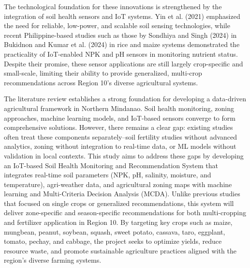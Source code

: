 {The technological foundation for these innovations is strengthened by the integration of soil health sensors and IoT systems. Yin et al. (2021) emphasized the need for reliable, low-power, and scalable soil sensing technologies, while recent Philippine-based studies such as those by Sondhiya and Singh (2024) in Bukidnon and Kumar et al. (2024) in rice and maize systems demonstrated the practicality of IoT-enabled NPK and pH sensors in monitoring nutrient status. Despite their promise, these sensor applications are still largely crop-specific and small-scale, limiting their ability to provide generalized, multi-crop recommendations across Region 10’s diverse agricultural systems.

The literature review establishes a strong foundation for developing a data-driven agricultural framework in Northern Mindanao. Soil health monitoring, zoning approaches, machine learning models, and IoT-based sensors converge to form comprehensive solutions. However, there remains a clear gap: existing studies often treat these components separately–soil fertility studies without advanced analytics, zoning without integration to real-time data, or ML models without validation in local contexts. This study aims to address these gaps by developing an IoT-based Soil Health Monitoring and Recommendation System that integrates real-time soil parameters (NPK, pH, salinity, moisture, and temperature), agri-weather data, and agricultural zoning maps with machine learning and Multi-Criteria Decision Analysis (MCDA). Unlike previous studies that focused on single crops or generalized recommendations, this system will deliver zone-specific and season-specific recommendations for both multi-cropping and fertilizer application in Region 10. By targeting key crops such as maize, mungbean, peanut, soybean, squash, sweet potato, cassava, taro, eggplant, tomato, pechay, and cabbage, the project seeks to optimize yields, reduce resource waste, and promote sustainable agriculture practices aligned with the region’s diverse farming systems.

}